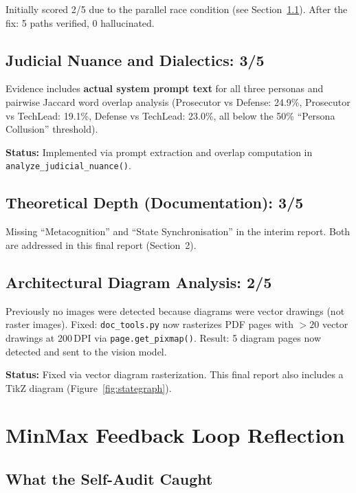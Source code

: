 \documentclass[11pt,a4paper]{article}
\begin{document}
Initially scored 2/5 due to the parallel race condition
(see Section~\ref{sec:bugfixes}).  After the fix: 5 paths verified, 0 hallucinated.

\subsection{Judicial Nuance and Dialectics: 3/5}

Evidence includes \textbf{actual system prompt text} for all three personas
and pairwise Jaccard word overlap analysis (Prosecutor vs Defense: 24.9\%,
Prosecutor vs TechLead: 19.1\%, Defense vs TechLead: 23.0\%, all below
the 50\% ``Persona Collusion'' threshold).

\textbf{Status:} Implemented via prompt extraction and overlap computation in \texttt{analyze\_judicial\_nuance()}.

\subsection{Theoretical Depth (Documentation): 3/5}

Missing ``Metacognition'' and ``State Synchronisation'' in the interim report.
Both are addressed in this final report (Section~2).

\subsection{Architectural Diagram Analysis: 2/5}

Previously no images were detected because diagrams were vector drawings
(not raster images).  Fixed: \texttt{doc\_tools.py} now rasterizes
PDF pages with $>20$ vector drawings at 200\,DPI via \texttt{page.get\_pixmap()}.
Result: 5 diagram pages now detected and sent to the vision model.

\textbf{Status:} Fixed via vector diagram rasterization. This final report also includes a TikZ diagram (Figure~\ref{fig:stategraph}).

\section{MinMax Feedback Loop Reflection}

\subsection{What the Self-Audit Caught}
\label{sec:bugfixes}
\end{document}

